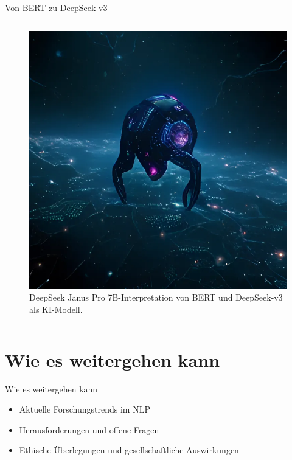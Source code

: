 \documentclass[aspectratio=1610, xcolor=dvipsnames, 9pt]{beamer}
\begin{document}
\begin{frame}{Von BERT zu DeepSeek-v3}
\begin{columns}
\begin{column}{0.5\textwidth}
\begin{figure}
               \end{figure}
              \begin{figure}
          \centering
            \includegraphics[height=0.35\textheight]{images/deepseek_selfimage.png}
            \caption{DeepSeek Janus Pro 7B-Interpretation von BERT und DeepSeek-v3 als KI-Modell.}
              \end{figure}
          \end{column}
  \end{columns}
\end{frame}

\section{Wie es weitergehen kann}

\begin{frame}{Wie es weitergehen kann}
  \begin{itemize}
    \item Aktuelle Forschungstrends im NLP
    \item Herausforderungen und offene Fragen
    \item Ethische Überlegungen und gesellschaftliche Auswirkungen
  \end{itemize}
\end{frame}
\end{document}
